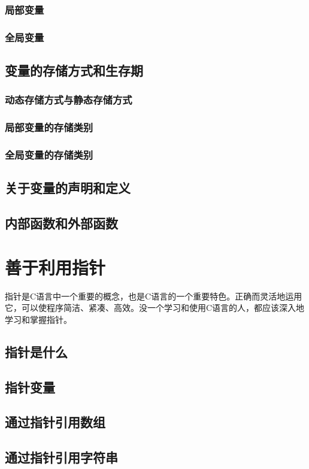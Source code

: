 \subsection{局部变量}
\subsection{全局变量}
\section{变量的存储方式和生存期}
\subsection{动态存储方式与静态存储方式}
\subsection{局部变量的存储类别}
\subsection{全局变量的存储类别}
\section{关于变量的声明和定义}
\section{内部函数和外部函数}


\chapter{善于利用指针}
指针是C语言中一个重要的概念，也是C语言的一个重要特色。正确而灵活地运用它，可以使程序简洁、紧凑、高效。没一个学习和使用C语言的人，都应该深入地学习和掌握指针。

\section{指针是什么}
\section{指针变量}
\section{通过指针引用数组}
\section{通过指针引用字符串}

